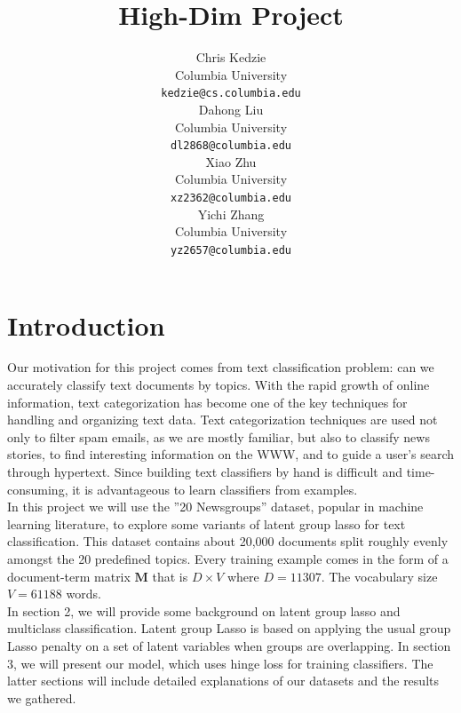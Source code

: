 \documentclass[11pt]{article}
\title{High-Dim Project}
\author{Chris Kedzie \\
  Columbia University\\
  {\small \tt kedzie@cs.columbia.edu} \\\And
  Dahong Liu \\
  Columbia University\\
  {\small \tt dl2868@columbia.edu} \\\And
  Xiao Zhu\\
  Columbia University\\
  {\small \tt xz2362@columbia.edu} \\\And
  Yichi Zhang\\
  Columbia University\\
  {\small \tt yz2657@columbia.edu} \\}
\date{}
\begin{document}
\maketitle

\section{Introduction}
Our motivation for this project comes from text classification problem: 
can we accurately classify text documents by topics. With the rapid growth 
of online information, text categorization has become one of the key techniques 
for handling and organizing text data. Text categorization techniques are used 
not only to filter spam emails, as we are mostly familiar, but also to classify 
news stories, to find interesting information on the WWW, and to guide a 
user's search through hypertext. Since building text classifiers by hand is 
difficult and time-consuming, it is advantageous to learn classifiers from examples. \\

In this project we will use the ''20 Newsgroups'' dataset, popular in machine 
learning literature, to explore some variants of latent group lasso for text classification. 
This dataset contains about 20,000 documents split roughly evenly amongst the 20 
predefined topics. Every training example comes in the form of a document-term 
matrix $\mathbf{M}$ that is $D\times V$ where $D=11307$. The vocabulary 
size $V= 61188$ words. \\

In section 2, we will provide some background on latent group lasso and 
multiclass classification. Latent group Lasso is based on applying the usual 
group Lasso penalty on a set of latent variables when groups are overlapping.
In section 3, we will present our model, which uses hinge loss for training classifiers. 
The latter sections will include detailed explanations of our datasets and the 
results we gathered.
\end{document}
